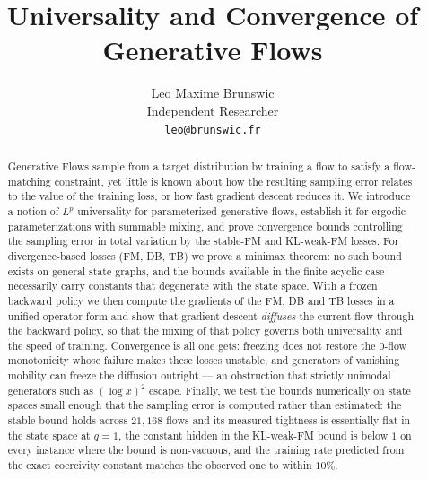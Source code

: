 \documentclass{article}
\title{Universality and Convergence of Generative Flows}
\author{Leo Maxime Brunswic \\
Independent Researcher \\
\texttt{leo@brunswic.fr}}
\theoremstyle{definition}
\theoremstyle{remark}
\begin{document}
\maketitle

\begin{abstract}
Generative Flows sample from a target distribution by training a flow to satisfy a
flow-matching constraint, yet little is known about how the resulting sampling error relates
to the value of the training loss, or how fast gradient descent reduces it. We introduce a
notion of $L^p$-universality for parameterized generative flows, establish it for ergodic
parameterizations with summable mixing, and prove convergence bounds controlling the sampling
error in total variation by the stable-FM and KL-weak-FM losses. For divergence-based losses
(FM, DB, TB) we prove a minimax theorem: no such bound exists on general state graphs, and the
bounds available in the finite acyclic case necessarily carry constants that degenerate with
the state space. With a frozen backward policy we then compute the gradients of the FM, DB and
TB losses in a unified operator form and show that gradient descent \emph{diffuses} the
current flow through the backward policy, so that the mixing of that policy governs both
universality and the speed of training. Convergence is all one gets: freezing does not restore
the $0$-flow monotonicity whose failure makes these losses unstable, and generators of
vanishing mobility can freeze the diffusion outright --- an obstruction that strictly unimodal
generators such as $(\log x)^2$ escape. Finally, we test the bounds numerically on state spaces
small enough that the sampling error is computed rather than estimated: the stable bound holds
across $21{,}168$ flows and its measured tightness is essentially flat in the state space at
$q=1$, the constant hidden in the KL-weak-FM bound is below $1$ on every instance where the
bound is non-vacuous, and the training rate predicted from the exact coercivity constant
matches the observed one to within $10\%$.
\end{abstract}








\end{document}
